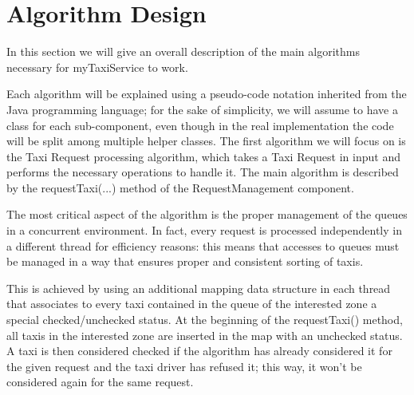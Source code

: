 \chapter{Algorithm Design}
In this section we will give an overall description of the main algorithms necessary for myTaxiService to work. 

Each algorithm will be explained using a pseudo-code notation inherited from the Java programming language; for the sake of simplicity, we will assume to have a class for each sub-component, even though in the real implementation the code will be split among multiple helper classes.
\vspace{5px}
\linebreak
The first algorithm we will focus on is the Taxi Request processing algorithm, which takes a Taxi Request in input and performs the necessary operations to handle it. The main algorithm is described by the requestTaxi(...) method of the RequestManagement component.

The most critical aspect of the algorithm is the proper management of the queues in a concurrent environment. In fact, every request is processed independently in a different thread for efficiency reasons: this means that accesses to queues must be managed in a way that ensures proper and consistent sorting of taxis.

This is achieved by using an additional mapping data structure in each thread that associates to every taxi contained in the queue of the interested zone a special checked/unchecked status. 
At the beginning of the requestTaxi() method, all taxis in the interested zone are inserted in the map with an unchecked status. A taxi is then considered checked if the algorithm has already considered it for the given request and the taxi driver has refused it; this way, it won't be considered again for the same request. 

